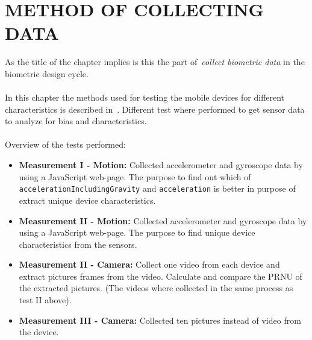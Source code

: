 \chapter{METHOD OF COLLECTING DATA}\label{cha:measurements}
As the title of the chapter implies is this the part of~\textit{collect biometric data} in the biometric design cycle.\\
\\
In this chapter the methods used for testing the mobile devices for different characteristics is described in~. Different test where performed to get sensor data to analyze for bias and characteristics. \\
\\
Overview of the tests performed:
\begin{itemize}
  \item[] \textbf{Measurement I - Motion:} Collected accelerometer and gyroscope data by using a JavaScript web-page. The purpose to find out which of \texttt{accelerationIncludingGravity} and \texttt{acceleration} is better in purpose of extract unique device characteristics.
  \item[] \textbf{Measurement II - Motion:} Collected accelerometer and gyroscope data by using a JavaScript web-page. The purpose to find unique device characteristics from the sensors. 
  \item[] \textbf{Measurement II - Camera:} Collect one video from each device and extract pictures frames from the video. Calculate and compare the PRNU of the extracted pictures. (The videos where collected in the same process as test II above).
  \item[] \textbf{Measurement III - Camera:} Collected ten pictures instead of video from the device. 
\end{itemize}

